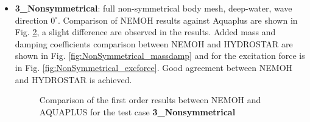\documentclass[12pt,a4paper,titlepage]{article}
\begin{document}
\begin{itemize}
\begin{figure}[h!t]
\caption{Comparison of the first order results between NEMOH and AQUAPLUS for the test case \textbf{2\_2Bodies}}\label{fig:2Bodies}
\end{figure}
\item \textbf{3\_Nonsymmetrical}: full non-symmetrical body mesh, deep-water, wave direction $0^{\circ}$. Comparison of NEMOH results against Aquaplus are shown in Fig. \ref{fig:NonSymmetrical}, a slight difference are observed in the results.  Added mass and damping coefficients comparison between NEMOH and HYDROSTAR are shown in Fig. \ref{fig:NonSymmetrical_massdamp} and for the excitation force is in Fig. \ref{fig:NonSymmetrical_excforce}. Good agreement between NEMOH and HYDROSTAR is achieved. 
\begin{figure}[h!t]
\centering
{}
\caption{Comparison of the first order results between NEMOH and AQUAPLUS for the test case \textbf{3\_Nonsymmetrical}}\label{fig:NonSymmetrical}
\end{figure}


\end{itemize}
\end{document}
